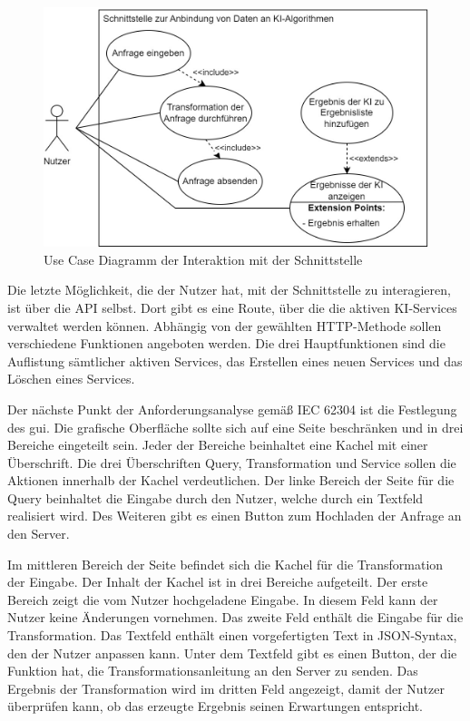 \begin{figure}[H]
  \centering
    \includegraphics[width = 15cm]{bilder/UseCase}
    \caption{Use Case Diagramm der Interaktion mit der Schnittstelle}
\end{figure}

Die letzte Möglichkeit, die der Nutzer hat, mit der Schnittstelle zu interagieren, ist über die API selbst. Dort gibt es eine Route, über die die aktiven KI-Services verwaltet werden können. Abhängig von der gewählten HTTP-Methode sollen verschiedene Funktionen angeboten werden. Die drei Hauptfunktionen sind die Auflistung sämtlicher aktiven Services, das Erstellen eines neuen Services und das Löschen eines Services.

Der nächste Punkt der Anforderungsanalyse gemäß IEC 62304 ist die Festlegung des \ac{gui}. Die grafische Oberfläche sollte sich auf eine Seite beschränken und in drei Bereiche eingeteilt sein. Jeder der Bereiche beinhaltet eine Kachel mit einer Überschrift. Die drei Überschriften \glqq Query\grqq{}, \glqq Transformation\grqq{} und \glqq Service\grqq{} sollen die Aktionen innerhalb der Kachel verdeutlichen.
Der linke Bereich der Seite für die Query beinhaltet die Eingabe durch den Nutzer, welche durch ein Textfeld realisiert wird. Des Weiteren gibt es einen Button zum Hochladen der Anfrage an den Server.

Im mittleren Bereich der Seite befindet sich die Kachel für die Transformation der Eingabe. Der Inhalt der Kachel ist in drei Bereiche aufgeteilt. Der erste Bereich zeigt die vom Nutzer hochgeladene Eingabe. In diesem Feld kann der Nutzer keine Änderungen vornehmen. Das zweite Feld enthält die Eingabe für die Transformation. Das Textfeld enthält einen vorgefertigten Text in JSON-Syntax, den der Nutzer anpassen kann. Unter dem Textfeld gibt es einen Button, der die Funktion hat, die Transformationsanleitung an den Server zu senden. Das Ergebnis der Transformation wird im dritten Feld angezeigt, damit der Nutzer überprüfen kann, ob das erzeugte Ergebnis seinen Erwartungen entspricht. 

